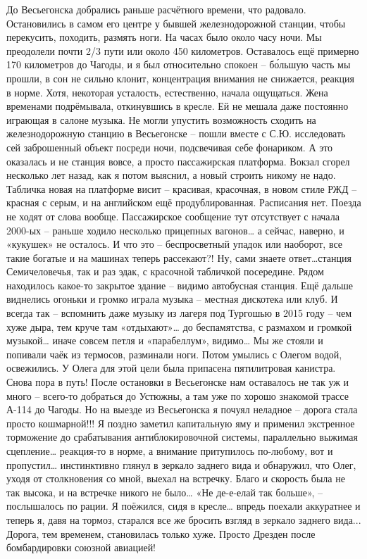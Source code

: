 До Весьегонска добрались раньше расчётного времени, что радовало. Остановились в самом его центре у бывшей железнодорожной станции, чтобы перекусить, походить, размять ноги. На часах было около часу ночи. Мы преодолели почти 2/3 пути или около 450 километров. Оставалось ещё примерно 170 километров до Чагоды, и я был относительно спокоен – б\'{о}льшую часть мы прошли, в сон не сильно клонит, концентрация внимания не снижается, реакция в норме. Хотя, некоторая усталость, естественно, начала ощущаться. Жена временами подрёмывала, откинувшись в кресле. Ей не мешала даже постоянно играющая в салоне музыка. 
Не могли упустить возможность сходить на железнодорожную станцию в Весьегонске – пошли вместе с С.Ю. исследовать сей заброшенный объект посреди ночи, подсвечивая себе фонариком. А это оказалась и не станция вовсе, а просто пассажирская платформа. Вокзал сгорел несколько лет назад, как я потом выяснил, а новый строить никому не надо. Табличка новая на платформе висит – красивая, красочная, в новом стиле РЖД – красная с серым, и на английском ещё продублированная. Расписания нет. Поезда не ходят от слова вообще. Пассажирское сообщение тут отсутствует с начала 2000-ых  – раньше ходило несколько прицепных вагонов… а сейчас, наверно, и «кукушек» не осталось. И что это – беспросветный упадок или наоборот, все такие богатые и на машинах теперь рассекают?! Ну, сами знаете ответ…станция Семичеловечья, так и раз эдак, с красочной табличкой посередине.
Рядом находилось какое-то закрытое здание – видимо автобусная станция. Ещё дальше виднелись огоньки и громко играла музыка – местная дискотека или клуб. И всегда так – вспомнить даже музыку из лагеря под Тургошью в 2015 году – чем хуже дыра, тем круче там «отдыхают»… до беспамятства, с размахом и громкой музыкой… иначе совсем петля и «парабеллум», видимо… Мы же стояли и попивали чаёк из термосов, разминали ноги. Потом умылись с Олегом водой, освежились. У Олега для этой цели была припасена пятилитровая канистра. Снова пора в путь!
После остановки в Весьегонске нам оставалось не так уж и много – всего-то добраться до Устюжны, а там уже по хорошо знакомой трассе А-114 до Чагоды. Но на выезде из Весьегонска я почуял неладное – дорога стала просто кошмарной!!! Я поздно заметил капитальную яму и применил экстренное торможение до срабатывания антиблокировочной системы, параллельно выжимая сцепление… реакция-то в норме, а внимание притупилось по-любому, вот и пропустил… инстинктивно глянул в зеркало заднего вида и обнаружил, что Олег, уходя от столкновения со мной, выехал на встречку. Благо и скорость была не так высока, и на встречке никого не было… «Не де-е-елай так больше», – послышалось по рации. Я поёжился, сидя в кресле… впредь поехали аккуратнее и теперь я, давя на тормоз, старался все же бросить взгляд в зеркало заднего вида... Дорога, тем временем, становилась только хуже. Просто Дрезден после бомбардировки союзной авиацией! 
